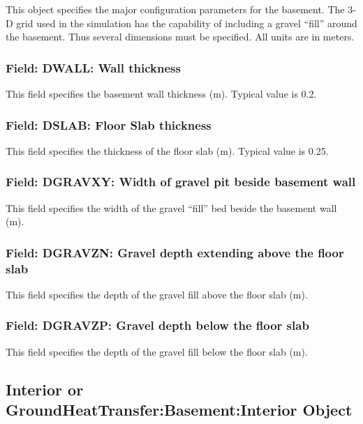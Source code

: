 This object specifies the major configuration parameters for the basement. The 3-D grid used in the simulation has the capability of including a gravel ``fill'' around the basement. Thus several dimensions must be specified. All units are in meters.

\subsubsection{Field: DWALL: Wall thickness}\label{field-dwall-wall-thickness}

This field specifies the basement wall thickness (m). Typical value is 0.2.

\subsubsection{Field: DSLAB: Floor Slab thickness}\label{field-dslab-floor-slab-thickness}

This field specifies the thickness of the floor slab (m). Typical value is 0.25.

\subsubsection{Field: DGRAVXY: Width of gravel pit beside basement wall}\label{field-dgravxy-width-of-gravel-pit-beside-basement-wall}

This field specifies the width of the gravel ``fill'' bed beside the basement wall (m).

\subsubsection{Field: DGRAVZN: Gravel depth extending above the floor slab}\label{field-dgravzn-gravel-depth-extending-above-the-floor-slab}

This field specifies the depth of the gravel fill above the floor slab (m).

\subsubsection{Field: DGRAVZP: Gravel depth below the floor slab}\label{field-dgravzp-gravel-depth-below-the-floor-slab}

This field specifies the depth of the gravel fill below the floor slab (m).

\subsection{Interior or GroundHeatTransfer:Basement:Interior Object}\label{interior-or-groundheattransferbasementinterior-object}

